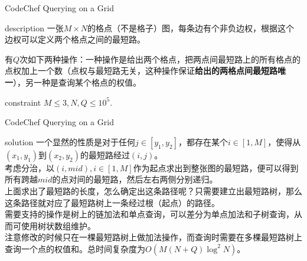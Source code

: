 \documentclass{beamer}
\def\le{\leqslant}
\begin{document}
\begin{frame}{CodeChef Querying on a Grid}
	\begin{block}{description}
		一张$M \times N$的格点（不是格子）图，每条边有个非负边权，根据这个边权可以定义两个格点之间的最短路。
		
		有$Q$次如下两种操作：一种操作是给出两个格点，把两点间最短路上的所有格点的点权加上一个数（点权与最短路无关，这种操作保证\textbf{给出的两格点间最短路唯一}），另一种是查询某个格点的权值。
	\end{block}
	\begin{block}{constraint}
		$M \le 3, N, Q \le 10^5.$
	\end{block}
\end{frame}
\begin{frame}{CodeChef Querying on a Grid}
	\begin{block}{solution}
		一个显然的性质是对于任何$j \in [y_1, y_2]$，都存在某个$i \in [1, M]$，使得从$(x_1, y_1)$到$(x_2, y_2)$的最短路经过$(i, j)$。\\
		
		考虑分治，以$(i, mid), i \in [1, M]$作为起点求出到整张图的最短路，便可以得到所有跨越$mid$的点对间的最短路，然后左右两侧分别递归。\\
		
		上面求出了最短路的长度，怎么确定出这条路径呢？只需要建立出最短路树，那么这条路径就对应了最短路树上一条经过根（起点）的路径。\\
		
		需要支持的操作是树上的链加法和单点查询，可以差分为单点加法和子树查询，从而可使用树状数组维护。\\
		
		注意修改的时候只在一棵最短路树上做加法操作，而查询时需要在多棵最短路树上查询一个点的权值和。总时间复杂度为$O(M(N+Q)\log^2 N)$。
	\end{block}
\end{frame}
\end{document}
